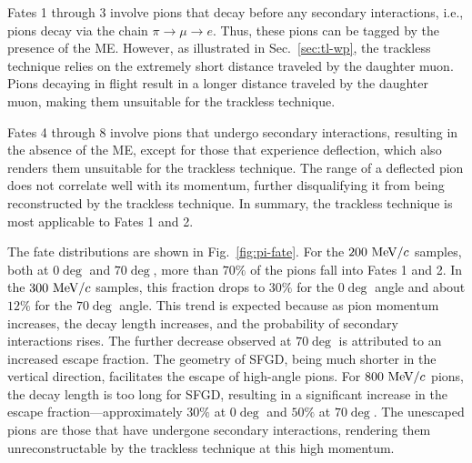           Fates 1 through 3 involve pions that decay before any secondary interactions, i.e., pions decay via the chain $\pi \rightarrow \mu \rightarrow e$. 
          Thus, these pions can be tagged by the presence of the ME. 
          However, as illustrated in Sec.~\ref{sec:tl-wp}, the trackless technique relies on the extremely short distance traveled by the daughter muon. 
          Pions decaying in flight result in a longer distance traveled by the daughter muon, making them unsuitable for the trackless technique.

          Fates 4 through 8 involve pions that undergo secondary interactions, resulting in the absence of the ME, except for those that experience deflection, which also renders them unsuitable for the trackless technique. 
          The range of a deflected pion does not correlate well with its momentum, further disqualifying it from being reconstructed by the trackless technique. 
          In summary, the trackless technique is most applicable to Fates 1 and 2.

          The fate distributions are shown in Fig.~\ref{fig:pi-fate}. 
          For the $200~\textrm{MeV}/c$ samples, both at $0\deg$ and $70\deg$, more than $70\%$ of the pions fall into Fates 1 and 2. 
          In the $300~\textrm{MeV}/c$ samples, this fraction drops to $30\%$ for the $0\deg$ angle and about $12\%$ for the $70\deg$ angle. 
          This trend is expected because as pion momentum increases, the decay length increases, and the probability of secondary interactions rises. 
          The further decrease observed at $70\deg$ is attributed to an increased escape fraction. 
          The geometry of SFGD, being much shorter in the vertical direction, facilitates the escape of high-angle pions. 
          For $800~\textrm{MeV}/c$ pions, the decay length is too long for SFGD, resulting in a significant increase in the escape fraction—approximately $30\%$ at $0\deg$ and $50\%$ at $70\deg$. 
          The unescaped pions are those that have undergone secondary interactions, rendering them unreconstructable by the trackless technique at this high momentum.

